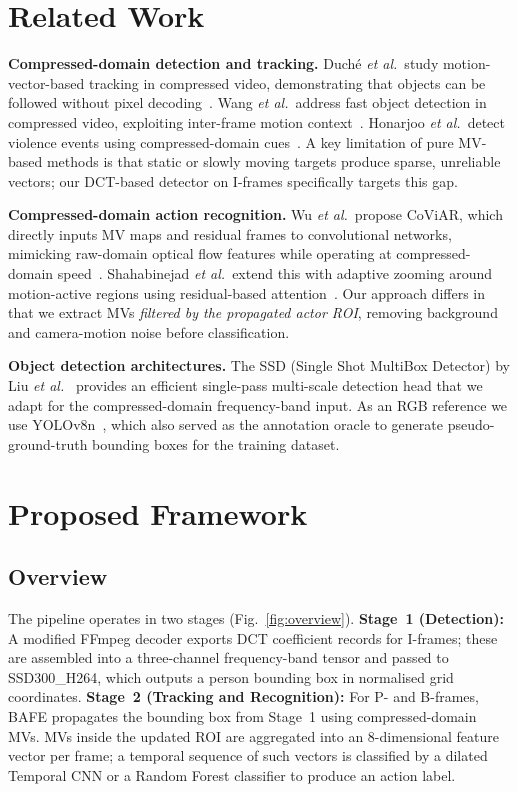 \documentclass[conference]{IEEEtran}
\begin{document}
\section{Related Work}

\textbf{Compressed-domain detection and tracking.}
Duch\'e \emph{et al.}\ study motion-vector-based tracking in compressed video, demonstrating that objects can be followed without pixel decoding~\cite{duche2026see}. Wang \emph{et al.}\ address fast object detection in compressed video, exploiting inter-frame motion context~\cite{wang2019fast}. Honarjoo \emph{et al.}\ detect violence events using compressed-domain cues~\cite{honarjoo2023violence}. A key limitation of pure MV-based methods is that static or slowly moving targets produce sparse, unreliable vectors; our DCT-based detector on I-frames specifically targets this gap.

\textbf{Compressed-domain action recognition.}
Wu \emph{et al.}\ propose CoViAR, which directly inputs MV maps and residual frames to convolutional networks, mimicking raw-domain optical flow features while operating at compressed-domain speed~\cite{wu2020mimic}. Shahabinejad \emph{et al.}\ extend this with adaptive zooming around motion-active regions using residual-based attention~\cite{shahabinejad2024adaptive}. Our approach differs in that we extract MVs \emph{filtered by the propagated actor ROI}, removing background and camera-motion noise before classification.

\textbf{Object detection architectures.}
The SSD (Single Shot MultiBox Detector) by Liu \emph{et al.}~\cite{liu2016ssd} provides an efficient single-pass multi-scale detection head that we adapt for the compressed-domain frequency-band input. As an RGB reference we use YOLOv8n~\cite{jocher2023yolov8}, which also served as the annotation oracle to generate pseudo-ground-truth bounding boxes for the training dataset.

\section{Proposed Framework}

\subsection{Overview}

The pipeline operates in two stages (Fig.~\ref{fig:overview}).
\textbf{Stage~1 (Detection):} A modified FFmpeg decoder exports DCT coefficient records for I-frames; these are assembled into a three-channel frequency-band tensor and passed to SSD300\_H264, which outputs a person bounding box in normalised grid coordinates.
\textbf{Stage~2 (Tracking and Recognition):} For P- and B-frames, BAFE propagates the bounding box from Stage~1 using compressed-domain MVs. MVs inside the updated ROI are aggregated into an 8-dimensional feature vector per frame; a temporal sequence of such vectors is classified by a dilated Temporal CNN or a Random Forest classifier to produce an action label.
\end{document}
